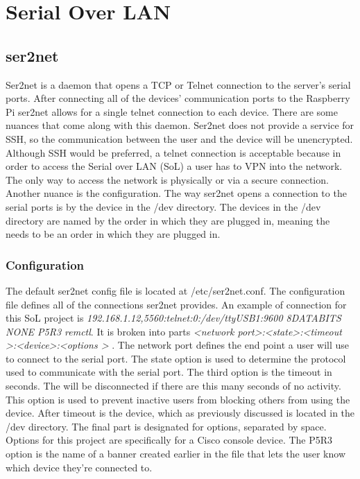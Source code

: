 \documentclass[12pt]{IEEEtran}
\begin{document}
\section{Serial Over LAN}
\subsection{ser2net}
Ser2net is a daemon that opens a TCP or Telnet connection to the server's serial ports.
After connecting all of the devices' communication ports to the Raspberry Pi ser2net allows for a single telnet connection to each device.
There are some nuances that come along with this daemon.
Ser2net does not provide a service for SSH, so the communication between the user and the device will be unencrypted.
Although SSH would be preferred, a telnet connection is acceptable because in order to access the Serial over LAN (SoL) a user has to VPN into the network.
The only way to access the network is physically or via a secure connection.
Another nuance is the configuration.
The way ser2net opens a connection to the serial ports is by the device in the /dev directory.
The devices in the /dev directory are named by the order in which they are plugged in, meaning the needs to be an order in which they are plugged in.
\subsubsection{Configuration}
The default ser2net config file is located at /etc/ser2net.conf.
The configuration file defines all of the connections ser2net provides.
An example of connection for this SoL project is \textit{192.168.1.12,5560:telnet:0:/dev/ttyUSB1:9600 8DATABITS NONE P5R3 remctl}.
It is broken into parts \textit{\textless network port\textgreater :\textless state\textgreater :\textless timeout \textgreater :\textless device\textgreater :\textless options \textgreater} 
\cite{ser}.
The network port defines the end point a user will use to connect to the serial port.
The state option is used to determine the protocol used to communicate with the serial port.
The third option is the timeout in seconds.
The will be disconnected if there are this many seconds of no activity.  
This option is used to prevent inactive users from blocking others from using the device.
After timeout is the device, which as previously discussed is located in the /dev directory.
The final part is designated for options, separated by space.
Options for this project are specifically for a Cisco console device.
The P5R3 option is the name of a banner created earlier in the file that lets the user know which device they're connected to. 
\end{document}
